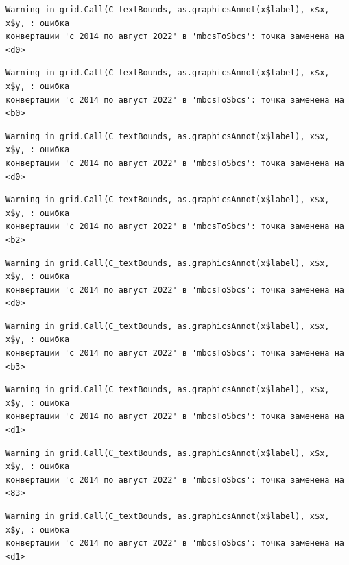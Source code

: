 \documentclass[
  letterpaper,
  DIV=11,
  numbers=noendperiod]{scrreprt}
\begin{document}
\begin{verbatim}
Warning in grid.Call(C_textBounds, as.graphicsAnnot(x$label), x$x, x$y, : ошибка
конвертации 'с 2014 по август 2022' в 'mbcsToSbcs': точка заменена на <d0>
\end{verbatim}

\begin{verbatim}
Warning in grid.Call(C_textBounds, as.graphicsAnnot(x$label), x$x, x$y, : ошибка
конвертации 'с 2014 по август 2022' в 'mbcsToSbcs': точка заменена на <b0>
\end{verbatim}

\begin{verbatim}
Warning in grid.Call(C_textBounds, as.graphicsAnnot(x$label), x$x, x$y, : ошибка
конвертации 'с 2014 по август 2022' в 'mbcsToSbcs': точка заменена на <d0>
\end{verbatim}

\begin{verbatim}
Warning in grid.Call(C_textBounds, as.graphicsAnnot(x$label), x$x, x$y, : ошибка
конвертации 'с 2014 по август 2022' в 'mbcsToSbcs': точка заменена на <b2>
\end{verbatim}

\begin{verbatim}
Warning in grid.Call(C_textBounds, as.graphicsAnnot(x$label), x$x, x$y, : ошибка
конвертации 'с 2014 по август 2022' в 'mbcsToSbcs': точка заменена на <d0>
\end{verbatim}

\begin{verbatim}
Warning in grid.Call(C_textBounds, as.graphicsAnnot(x$label), x$x, x$y, : ошибка
конвертации 'с 2014 по август 2022' в 'mbcsToSbcs': точка заменена на <b3>
\end{verbatim}

\begin{verbatim}
Warning in grid.Call(C_textBounds, as.graphicsAnnot(x$label), x$x, x$y, : ошибка
конвертации 'с 2014 по август 2022' в 'mbcsToSbcs': точка заменена на <d1>
\end{verbatim}

\begin{verbatim}
Warning in grid.Call(C_textBounds, as.graphicsAnnot(x$label), x$x, x$y, : ошибка
конвертации 'с 2014 по август 2022' в 'mbcsToSbcs': точка заменена на <83>
\end{verbatim}

\begin{verbatim}
Warning in grid.Call(C_textBounds, as.graphicsAnnot(x$label), x$x, x$y, : ошибка
конвертации 'с 2014 по август 2022' в 'mbcsToSbcs': точка заменена на <d1>
\end{verbatim}
\end{document}
